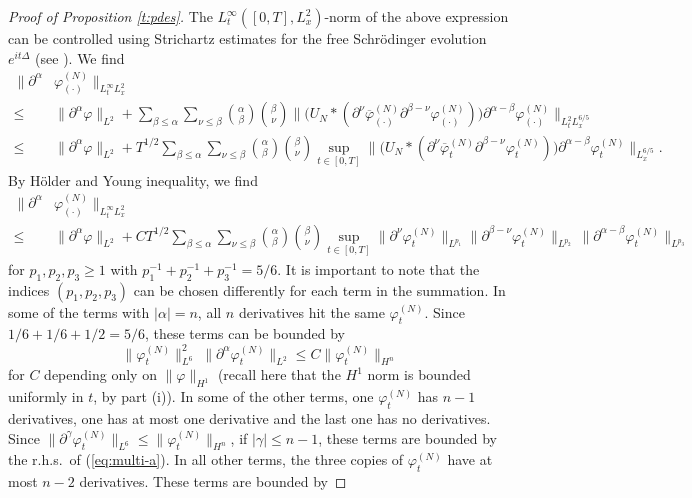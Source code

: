\documentclass[11pt,a4paper]{article}
\begin{document}
\begin{proof}[Proof of Proposition \ref{t:pdes}]
The $L_t^\infty ([0,T] , L_x^2)$-norm of the above expression can be controlled using
Strichartz estimates for the free Schr\"odinger evolution $e^{it\Delta}$
(see \cite[Theorem 1.2]{KT}). We find
\[\begin{split}
\| \partial^\alpha & \varphi^{(N)}_{(\cdot)} \|_{L_t^\infty L_x^2}  \\ \leq \; & \|
    \partial^\alpha \varphi \|_{L^2} +  \sum_{\beta \le \alpha} \sum_{\nu \le \beta} \binom{\alpha}{\beta}
    \binom{\beta}{\nu} \| \big( U_N * (\partial^\nu
    \overline{\varphi}^{(N)}_{(\cdot)} \partial^{\beta - \nu} \varphi^{(N)}_{(\cdot)})
    \big) \partial^{\alpha - \beta} \varphi^{(N)}_{(\cdot)} \|_{L_t^2 L_x^{6/5}} \\
     \leq \; & \|
    \partial^\alpha \varphi \|_{L^2} +  T^{1/2} \sum_{\beta \le \alpha} \sum_{\nu \le \beta} \binom{\alpha}{\beta}
    \binom{\beta}{\nu}  \sup_{t \in [0,T]} \| \big( U_N * (\partial^\nu
    \overline{\varphi}^{(N)}_{t} \partial^{\beta - \nu} \varphi^{(N)}_{t})
    \big) \partial^{\alpha - \beta} \varphi^{(N)}_{t} \|_{L_x^{6/5}}.
\end{split} \]    
By H\"older and Young inequality, we find 
\[ \begin{split}
\| \partial^\alpha & \varphi^{(N)}_{(\cdot)} \|_{L_t^\infty L_x^2} \\ \leq \; & \|
    \partial^\alpha \varphi \|_{L^2} + C T^{1/2}  \sum_{\beta \le \alpha} \sum_{\nu \le \beta}
    \binom{\alpha}{\beta} \binom{\beta}{\nu} \sup_{t \in [0,T]} \|
    \partial^\nu \varphi_t^{(N)} \|_{L^{p_1}} \| \partial^{\beta - \nu} \varphi_t^{(N)}
    \|_{L^{p_2}} \, \| \partial^{\alpha - \beta} \varphi_t^{(N)}
    \|_{L^{p_3}} 
  \end{split}\]
for $p_1, p_2, p_3 \geq 1$ with $p_1^{-1} + p_2^{-1} + p_3^{-1} = 5/6$. It is important to note that the indices $(p_1, p_2, p_3)$ can be chosen differently for each term in the summation. In some of the terms with $\lvert \alpha\rvert = n$, all $n$ derivatives hit the same $\varphi_t^{(N)}$. Since $1/6 + 1/6 + 1/2 = 5/6$, these terms can be bounded by
\begin{equation}\label{eq:multi-a}  \| \varphi_t^{(N)} \|^2_{L^6} \; \| \partial^\alpha \varphi_t^{(N)} \|_{L^2} \leq C \| \varphi_t^{(N)} \|_{H^n} \end{equation} for $C$ depending only on $\| \varphi \|_{H^1}$ (recall here that the $H^1$ norm is bounded uniformly in $t$, by part (i)). In some of the other terms, one $\varphi_t^{(N)}$ has $n - 1$ derivatives, one has at most one derivative and the last one has no derivatives. Since $\| \partial^{\gamma} \varphi_t^{(N)} \|_{L^6} \leq \| \varphi_t^{(N)} \|_{H^n}$, if $|\gamma| \leq n-1$, these terms are bounded by the r.h.s.\ of (\ref{eq:multi-a}). In all other terms, the three copies of $\varphi_t^{(N)}$ have at most $n-2$ derivatives. These terms are bounded by 

\end{proof}
\end{document}
